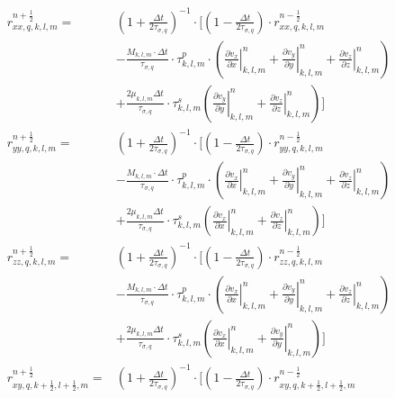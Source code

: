 \documentclass[pdftex,a4paper,parskip,listof=totoc,bibliography=totoc,onehalfspacing,12pt]{scrreprt}
\begin{document}
\begin{align*}
	r_{xx,q,k,l,m}^{n+\frac{1}{2}} =& \left( 1+ \frac{\Delta t}{2\tau_{\sigma,q}} \right)^{-1}\cdot \Bigg[\left( 1- \frac{\Delta t}{2\tau_{\sigma,q}}  \right) \cdot r_{xx,q,k,l,m}^{n-\frac{1}{2}} \\ 
	& -\frac{M_{k,l,m}\cdot\Delta t}{\tau_{\sigma,q}}\cdot \tau^p_{k,l,m} \cdot \left( \left.\frac{\partial v_x}{\partial x}\right\rvert_{k,l,m}^{n} + \left.\frac{\partial v_y}{\partial y}\right\rvert_{k,l,m}^{n} + \left.\frac{\partial v_z}{\partial z}\right\rvert_{k,l,m}^{n} \right)\\
	& + \frac{2\mu_{k,l,m} \Delta t}{\tau_{\sigma,q}}\cdot \tau_{k,l,m}^s \left( \left.\frac{\partial v_y}{\partial y}\right\rvert_{k,l,m}^{n} + \left.\frac{\partial v_z}{\partial z}\right\rvert_{k,l,m}^{n}  \right)\Bigg] \\
	r_{yy,q,k,l,m}^{n+\frac{1}{2}} =& \left( 1+ \frac{\Delta t}{2\tau_{\sigma,q}} \right)^{-1}\cdot \Bigg[\left( 1- \frac{\Delta t}{2\tau_{\sigma,q}}  \right) \cdot r_{yy,q,k,l,m}^{n-\frac{1}{2}} \\ 
	& -\frac{M_{k,l,m}\cdot\Delta t}{\tau_{\sigma,q}}\cdot \tau^p_{k,l,m} \cdot \left( \left.\frac{\partial v_x}{\partial x}\right\rvert_{k,l,m}^{n} + \left.\frac{\partial v_y}{\partial y}\right\rvert_{k,l,m}^{n} + \left.\frac{\partial v_z}{\partial z}\right\rvert_{k,l,m}^{n} \right)\\
	& + \frac{2\mu_{k,l,m} \Delta t}{\tau_{\sigma,q}}\cdot \tau_{k,l,m}^s \left( \left.\frac{\partial v_x}{\partial x}\right\rvert_{k,l,m}^{n} + \left.\frac{\partial v_z}{\partial z}\right\rvert_{k,l,m}^{n}  \right)\Bigg] \\
	r_{zz,q,k,l,m}^{n+\frac{1}{2}} =& \left( 1+ \frac{\Delta t}{2\tau_{\sigma,q}} \right)^{-1}\cdot \Bigg[\left( 1- \frac{\Delta t}{2\tau_{\sigma,q}}  \right) \cdot r_{zz,q,k,l,m}^{n-\frac{1}{2}} \\ 
	& -\frac{M_{k,l,m}\cdot\Delta t}{\tau_{\sigma,q}}\cdot \tau^p_{k,l,m} \cdot \left( \left.\frac{\partial v_x}{\partial x}\right\rvert_{k,l,m}^{n} + \left.\frac{\partial v_y}{\partial y}\right\rvert_{k,l,m}^{n} + \left.\frac{\partial v_z}{\partial z}\right\rvert_{k,l,m}^{n} \right)\\
	& + \frac{2\mu_{k,l,m} \Delta t}{\tau_{\sigma,q}}\cdot \tau_{k,l,m}^s \left( \left.\frac{\partial v_x}{\partial x}\right\rvert_{k,l,m}^{n} + \left.\frac{\partial v_y}{\partial y}\right\rvert_{k,l,m}^{n}  \right)\Bigg] \\
	r_{xy,q,k+\frac{1}{2},l+\frac{1}{2},m}^{n+\frac{1}{2}} =& \left( 1+ \frac{\Delta t}{2\tau_{\sigma,q}} \right)^{-1}\cdot \Bigg[\left( 1- \frac{\Delta t}{2\tau_{\sigma,q}}  \right) \cdot r_{xy,q,k+\frac{1}{2},l+\frac{1}{2},m}^{n-\frac{1}{2}} \\ 

\end{align*}
\end{document}
